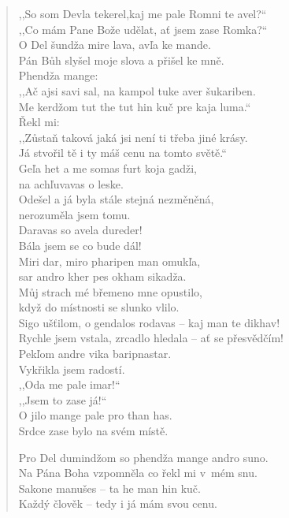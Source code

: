 \begin{verse}
\medskip

,,So som Devla tekerel,kaj me pale Romni te avel?`` \\
,,Co mám Pane Bože udělat, ať jsem zase Romka?`` \\
O Del šundža mire lava, avľa ke mande. \\
Pán Bůh slyšel moje slova a přišel ke mně. \\
Phendža mange: \\
,,Ač ajsi savi sal, na kampol tuke aver šukariben. \\
 Me kerdžom tut the tut hin kuč pre kaja luma.`` \\
Řekl mi: \\
 ,,Zůstaň taková jaká jsi není ti třeba jiné krásy. \\
  Já stvořil tě i ty máš cenu na tomto světě.`` \\
Geľa het a me somas furt koja gadži, \\
\hspace{\fill}na achľuvavas o leske. \\
Odešel a já byla stále stejná nezměněná, \\
\hspace{\fill}nerozuměla jsem tomu. \\
Daravas so avela dureder! \\
Bála jsem se co bude dál! \\
Miri dar, miro pharipen man omukľa, \\
\hspace{\fill}sar andro kher pes okham sikadža. \\
Můj strach mé břemeno mne opustilo, \\
\hspace{\fill}když do místnosti se slunko vlilo. \\
Sigo ušťilom, o gendalos rodavas -- kaj man te dikhav! \\
Rychle jsem vstala, zrcadlo hledala -- ať se přesvědčím! \\
Pekľom andre vika baripnastar. \\
Vykřikla jsem radostí. \\
,,Oda me pale imar!`` \\
,,Jsem to zase já!`` \\
O jilo mange pale pro than has. \\
Srdce zase bylo na svém místě.

\medskip

Pro Del dumindžom so phendža mange andro suno. \\
Na Pána Boha vzpomněla co řekl mi v mém snu. \\
Sakone manušes -- ta he man hin kuč. \\
Každý člověk -- tedy i já mám svou cenu.


\end{verse}
